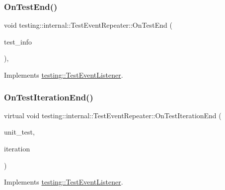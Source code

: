 \subsubsection{\texorpdfstring{OnTestEnd()}{OnTestEnd()}\hspace{0.1cm}{\footnotesize\ttfamily [3/3]}}
{\footnotesize\ttfamily void testing\+::internal\+::\+Test\+Event\+Repeater\+::\+On\+Test\+End (\begin{DoxyParamCaption}\item[{const \mbox{\hyperlink{classtesting_1_1_test_info}{Test\+Info}} \&}]{test\+\_\+info }\end{DoxyParamCaption})\hspace{0.3cm}{\ttfamily [override]}, {\ttfamily [virtual]}}



Implements \mbox{\hyperlink{classtesting_1_1_test_event_listener_abb1c44525ef038500608b5dc2f17099b}{testing\+::\+Test\+Event\+Listener}}.

\mbox{\label{classtesting_1_1internal_1_1_test_event_repeater_a0e696d3c93a9f45fcf7142555fecad35}} 
\subsubsection{\texorpdfstring{OnTestIterationEnd()}{OnTestIterationEnd()}\hspace{0.1cm}{\footnotesize\ttfamily [1/3]}}
{\footnotesize\ttfamily virtual void testing\+::internal\+::\+Test\+Event\+Repeater\+::\+On\+Test\+Iteration\+End (\begin{DoxyParamCaption}\item[{const \mbox{\hyperlink{classtesting_1_1_unit_test}{Unit\+Test}} \&}]{unit\+\_\+test,  }\item[{int}]{iteration }\end{DoxyParamCaption})\hspace{0.3cm}{\ttfamily [virtual]}}



Implements \mbox{\hyperlink{classtesting_1_1_test_event_listener_a550fdb3e55726e4cefa09f5697941425}{testing\+::\+Test\+Event\+Listener}}.

\mbox{\label{classtesting_1_1internal_1_1_test_event_repeater_aa4a52e544380946ff86fc57915aa7152}} 
